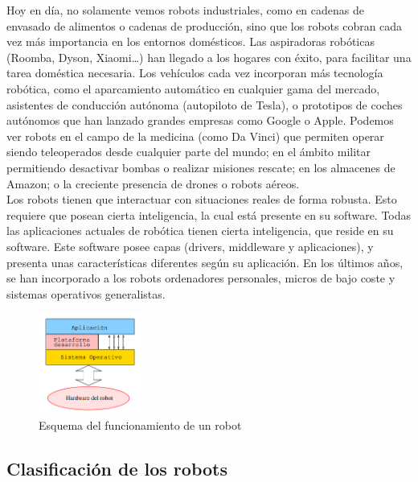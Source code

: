 Hoy en día, no solamente vemos robots industriales, como en cadenas de envasado de alimentos o cadenas de producción, sino que los robots cobran cada vez más importancia en los entornos domésticos. Las aspiradoras robóticas (Roomba, Dyson, Xiaomi…) han llegado a los hogares con éxito, para facilitar una tarea doméstica necesaria. Los vehículos cada vez incorporan más tecnología robótica, como el aparcamiento automático en cualquier gama del mercado, asistentes de conducción autónoma (autopiloto de Tesla), o prototipos de coches autónomos que han lanzado grandes empresas como Google o Apple. Podemos ver robots en el campo de la medicina (como Da Vinci) que permiten operar siendo teleoperados desde cualquier parte del mundo; en el ámbito militar permitiendo desactivar bombas o realizar misiones rescate; en los almacenes de Amazon; o la creciente presencia de drones o robots aéreos.\\

Los robots tienen que interactuar con situaciones reales de forma robusta. Esto requiere que posean cierta inteligencia, la cual está presente en su software. Todas las aplicaciones actuales de robótica tienen cierta inteligencia, que reside en su software. Este software posee capas (drivers, middleware y aplicaciones), y presenta unas características diferentes según su aplicación. En los últimos años, se han incorporado a los robots ordenadores personales, micros de bajo coste y sistemas operativos generalistas.

\begin{figure}[H]
  \begin{center}
    \includegraphics[width=0.3\textwidth]{figures/Introduccion/Esquema_Robot.png}
		\caption{Esquema del funcionamiento de un robot}
		\label{fig.Esquema_Robot}
		\end{center}
\end{figure}

\subsection{Clasificación de los robots}

